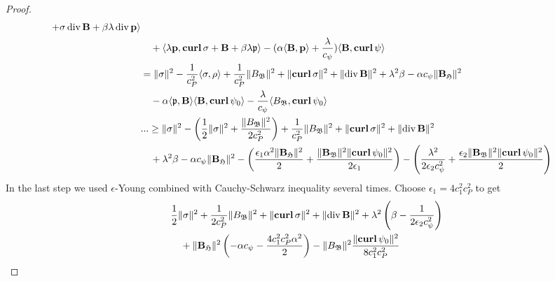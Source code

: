 \documentclass[../master_thesis.tex]{subfiles}
\begin{document}
\begin{proof}
\begin{align*}
            + \sigma \diver \mathbf{B} + \beta \lambda \diver \mathbf{p}\rangle
        \\ &\quad + \langle \lambda \mathbf{p}, \veccurl \sigma + \mathbf{B} + \beta \lambda \mathfrak{p}\rangle
            - (\alpha \langle \mathbf{B}, \mathbf{p} \rangle + \frac{\lambda}{c_\psi})
            \langle \mathbf{B} , \veccurl\psi \rangle
        \\ &= \lVert \sigma \rVert^2 - \frac{1}{c_P^2} \langle \sigma , \rho \rangle 
            + \frac{1}{c_P^2} \lVert B_\mathfrak{B} \rVert^2 + \lVert  \veccurl \sigma \rVert^2
            + \lVert \diver \mathbf{B} \rVert ^2 + \lambda ^2 \beta - \alpha c_\psi \lVert \mathbf{B}_\mathfrak{H} \rVert^2
        \\ &\quad- \alpha \langle \mathfrak{p}, \mathbf{B} \rangle \langle \mathbf{B}, \veccurl \psi_0 \rangle
            - \frac{\lambda}{c_\psi} \langle B_\mathfrak{B} , \veccurl \psi_0 \rangle
        \\ &...\geq \lVert \sigma \rVert^2 - 
            \left( \frac{1}{2} \lVert \sigma \rVert^2 
            + \frac{\lVert B_\mathfrak{B} \rVert^2}{2 c_P^2}  \right)
            + \frac{1}{c_P^2} \lVert B_\mathfrak{B} \rVert^2
            + \lVert  \veccurl \sigma \rVert^2 + \lVert \diver \mathbf{B} \rVert ^2
        \\ &\quad+ \lambda ^2 \beta - \alpha c_\psi \lVert \mathbf{B}_\mathfrak{H} \rVert^2
            - \left( \frac{\epsilon_1 \alpha^2 \lVert \mathbf{B}_\mathfrak{H} \rVert^2}{2} 
            + \frac{\lVert \mathbf{B}_\mathfrak{B} \rVert^2 \lVert  \veccurl \psi_0 \rVert^2}{2 \epsilon_1} \right)
            - \left( \frac{\lambda^2}{2 \epsilon_2 c_\psi^2} 
            + \frac{\epsilon_2 \lVert \mathbf{B}_\mathfrak{B} \rVert^2 \lVert  \veccurl \psi_0 \rVert^2}{2} \right)
    \end{align*}
    In the last step we used $\epsilon$-Young combined with Cauchy-Schwarz inequality several times. 
    Choose $\epsilon_1 = 4 c_1^2 c_P^2$ to get 
    \begin{align*}
        &\frac{1}{2} \lVert \sigma \rVert^2 + \frac{1}{2 c_P^2} \lVert B_\mathfrak{B} \rVert^2
        + \lVert  \veccurl \sigma \rVert^2 + \lVert \diver \mathbf{B} \rVert ^2
        + \lambda ^2 \left( \beta - \frac{1}{2 \epsilon_2 c_\psi^2} \right) 
        \\ &\quad+ \lVert \mathbf{B}_\mathfrak{H} \rVert^2 
        \left( - \alpha c_\psi - \frac{4 c_1^2 c_P^2 \alpha^2}{2} \right)
        - \lVert B_\mathfrak{B} \rVert^2 \frac{\lVert  \veccurl \psi_0 \rVert^2}{8c_1^2 c_P^2}

\end{align*}
\end{proof}
\end{document}
